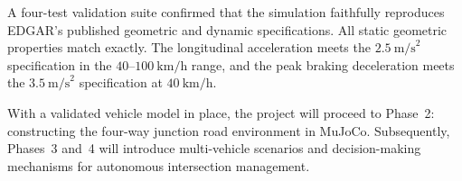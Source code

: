\documentclass[a4paper,12pt]{report}
\begin{document}
A four-test validation suite confirmed that the simulation faithfully reproduces
EDGAR's published geometric and dynamic specifications. All static geometric
properties match exactly. The longitudinal acceleration meets the
$2.5\ \text{m/s}^2$ specification in the $40$–$100\ \text{km/h}$ range, and
the peak braking deceleration meets the $3.5\ \text{m/s}^2$ specification at
$40\ \text{km/h}$.

With a validated vehicle model in place, the project will proceed to Phase~2:
constructing the four-way junction road environment in MuJoCo. Subsequently,
Phases~3 and~4 will introduce multi-vehicle scenarios and decision-making
mechanisms for autonomous intersection management.



\end{document}
